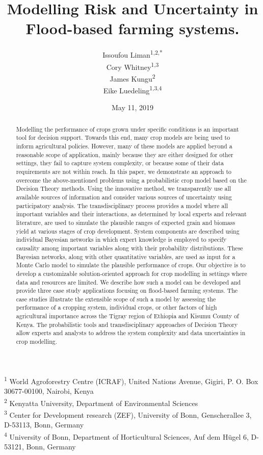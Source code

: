 \documentclass[12pt,oneside]{article}
\title{Modelling Risk and Uncertainty in Flood-based farming systems.}
\author{Issoufou Liman\textsuperscript{1,2,*} \\ Cory Whitney\textsuperscript{1,3} \\ James Kungu\textsuperscript{2} \\ Eike Luedeling\textsuperscript{1,3,4}}
\date{May 11, 2019}
\begin{document}
\maketitle
\begin{abstract}
Modelling the performance of crops grown under specific conditions is an
important tool for decision support. Towards this end, many crop models
are being used to inform agricultural policies. However, many of these
models are applied beyond a reasonable scope of application, mainly
because they are either designed for other settings, they fail to
capture system complexity, or because some of their data requirements
are not within reach. In this paper, we demonstrate an approach to
overcome the above-mentioned problems using a probabilistic crop model
based on the Decision Theory methods. Using the innovative method, we
transparently use all available sources of information and consider
various sources of uncertainty using participatory analysis. The
transdisciplinary process provides a model where all important variables
and their interactions, as determined by local experts and relevant
literature, are used to simulate the plausible ranges of expected grain
and biomass yield at various stages of crop development. System
components are described using individual Bayesian networks in which
expert knowledge is employed to specify causality among important
variables along with their probability distributions. These Bayesian
networks, along with other quantitative variables, are used as input for
a Monte Carlo model to simulate the plausible performance of crops. Our
objective is to develop a customizable solution-oriented approach for
crop modelling in settings where data and resources are limited. We
describe how such a model can be developed and provide three case study
applications focusing on flood-based farming systems. The case studies
illustrate the extensible scope of such a model by assessing the
performance of a cropping system, individual crops, or other factors of
high agricultural importance across the Tigray region of Ethiopia and
Kisumu County of Kenya. The probabilistic tools and transdisciplinary
approaches of Decision Theory allow experts and analysts to address the
system complexity and data uncertainties in crop modelling.
\end{abstract}

{
\hypersetup{linkcolor=black}
\setcounter{tocdepth}{5}
\tableofcontents
}
\textsuperscript{1} World Agroforestry Centre (ICRAF), United Nations
Avenue, Gigiri, P. O. Box 30677-00100, Nairobi, Kenya\\
\textsuperscript{2} Kenyatta University, Department of Environmental
Sciences\\
\textsuperscript{3} Center for Development research (ZEF), University of
Bonn, Genscherallee 3, D-53113, Bonn, Germany\\
\textsuperscript{4} University of Bonn, Department of Horticultural
Sciences, Auf dem Hügel 6, D-53121, Bonn, Germany
\end{document}
